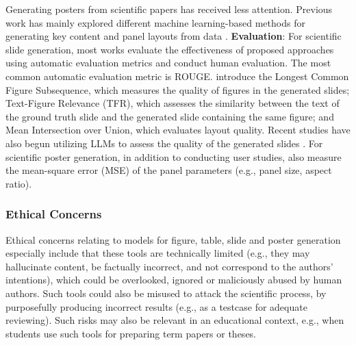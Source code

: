 Generating posters from scientific papers has received less attention. Previous work has mainly explored different machine learning-based methods for generating key content and panel layouts from data \cite{Qiang2016LearningTG,Xu2022PosterBotAS}.
\textbf{Evaluation}: For scientific slide generation, most works evaluate the effectiveness of proposed approaches using automatic evaluation metrics and conduct human evaluation. %
The most common automatic evaluation metric is ROUGE. %
\citet{Fu2021DOC2PPTAP} introduce the Longest Common Figure Subsequence, which measures the quality of figures in the generated slides; Text-Figure Relevance (TFR), which assesses the similarity between the text of the ground truth slide and the generated slide containing the same figure; and Mean Intersection over Union, which evaluates layout quality. Recent studies have also begun utilizing LLMs to assess the quality of the generated slides \citep{bandyopadhyay-etal-2024-enhancing-presentation1,maheshwari-etal-2024-presentations}. For scientific poster generation, in addition to conducting user studies, \citet{Qiang2016LearningTG} also measure the mean-square error (MSE) of the panel parameters (e.g., panel size, aspect ratio). 


\subsubsection{Ethical Concerns}

Ethical concerns relating to models for figure, table, slide and poster generation especially include that these tools are technically limited (e.g., they may hallucinate content, be factually incorrect, and not correspond to the authors' intentions), which could be overlooked, ignored or maliciously abused by human authors. Such tools could also be misused to attack the scientific process, by purposefully producing incorrect results (e.g., as a testcase for adequate reviewing). Such risks may also be relevant in an educational context, e.g., when students use such tools for preparing term papers or theses.



